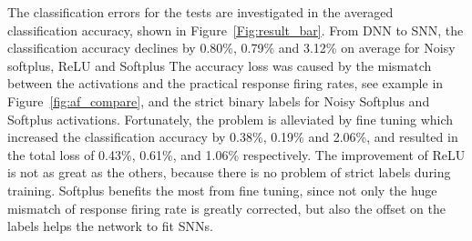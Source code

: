 \documentclass{article}
\begin{document}
The classification errors for the tests are investigated in the averaged classification accuracy, shown in Figure~\ref{Fig:result_bar}.
From DNN to SNN, the classification accuracy declines by 0.80\%, 0.79\% and 3.12\% on average for Noisy softplus, ReLU and Softplus
The accuracy loss was caused by the mismatch between the activations and the practical response firing rates, see example in Figure~\ref{fig:af_compare}, and the strict binary labels for Noisy Softplus and Softplus activations.
Fortunately, the problem is alleviated by fine tuning which increased the classification accuracy by 0.38\%, 0.19\% and 2.06\%, and resulted in the total loss of 0.43\%, 0.61\%, and 1.06\% respectively.
The improvement of ReLU is not as great as the others, because there is no problem of strict labels during training.
Softplus benefits the most from fine tuning, since not only the huge mismatch of response firing rate is greatly corrected, but also the offset on the labels helps the network to fit SNNs. 

\end{document}
